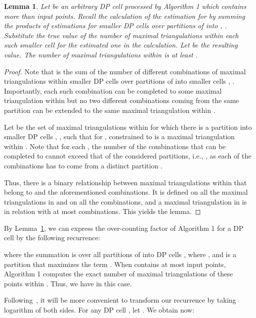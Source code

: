 \documentclass[a4paper]{article}
\newtheorem{lemma}{Lemma}
\begin{document}
\begin{lemma}\label{lem: over1}
Let  be an arbitrary DP cell 
processed by Algorithm 1 which
contains more than  input points.
Recall the calculation of the estimation for
 by summing the products of estimations
for smaller DP cells  over  partitions
of  into , .
Substitute the true value of
the number of maximal triangulations within 
each such smaller cell  for the estimated one
in the calculation.
Let  be the resulting value. The
number of maximal triangulations within
 is at least .
\end{lemma}
\begin{proof}
Note that  is the sum of the number
of different combinations  
of maximal triangulations within  
smaller DP cells 
over  partitions of
 into smaller cells , 
. Importantly, each
such combination can be completed
to some maximal triangulation within 
but no two different combinations coming
from the same partition 
can be extended to the same maximal triangulation
within .

Let  be the set of maximal triangulations 
within  for which there is a partition
into smaller DP cells , ,
such that for ,  constrained
to  is a maximal triangulation within .
Note that for each , the number of the combinations
that can be completed to   cannot exceed that
of the considered partitions, i.e., ,
as each of the combinations has to come
from a distinct partition .

Thus, there is a binary relationship between
maximal triangulations within  that
belong to  and the aforementioned
combinations. It is defined on all the
maximal triangulations in  and on all the combinations,
and a maximal triangulation in 
is in relation with at most  combinations.
This yields the lemma.
\end{proof}

By Lemma~\ref{lem: over1}, we can express the over-counting
factor  of Algorithm 1 for 
a DP cell  
by the following recurrence:



where the summation is over all partitions of  into
DP cells , where , 
and  is a partition
that maximizes the term .
When  contains at most  input points,
Algorithm 1 computes the exact number of maximal
triangulations of these points within . Thus, we have
  in this case.


Following~\cite{ABRS13}, it will be more convenient
to transform our recurrence by taking
logarithm of both sides.
For any DP cell , let
.
We obtain now:
\end{document}
